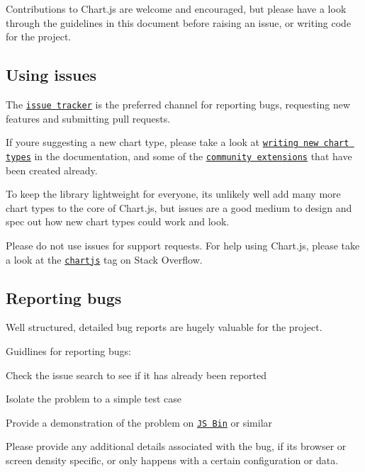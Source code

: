Contributions to Chart.\+js are welcome and encouraged, but please have a look through the guidelines in this document before raising an issue, or writing code for the project.

\subsection*{Using issues }

The \href{https://github.com/nnnick/Chart.js/issues}{\tt issue tracker} is the preferred channel for reporting bugs, requesting new features and submitting pull requests.

If you\textquotesingle{}re suggesting a new chart type, please take a look at \href{https://github.com/nnnick/Chart.js/blob/master/docs/06-Advanced.md#writing-new-chart-types}{\tt writing new chart types} in the documentation, and some of the \href{https://github.com/nnnick/Chart.js/blob/master/docs/06-Advanced.md#community-extensions}{\tt community extensions} that have been created already.

To keep the library lightweight for everyone, it\textquotesingle{}s unlikely we\textquotesingle{}ll add many more chart types to the core of Chart.\+js, but issues are a good medium to design and spec out how new chart types could work and look.

Please do not use issues for support requests. For help using Chart.\+js, please take a look at the \href{http://stackoverflow.com/questions/tagged/chartjs}{\tt {\ttfamily chartjs}} tag on Stack Overflow.

\subsection*{Reporting bugs }

Well structured, detailed bug reports are hugely valuable for the project.

Guidlines for reporting bugs\+:


\begin{DoxyItemize}
\item Check the issue search to see if it has already been reported
\item Isolate the problem to a simple test case
\item Provide a demonstration of the problem on \href{http://jsbin.com}{\tt JS Bin} or similar
\end{DoxyItemize}

Please provide any additional details associated with the bug, if it\textquotesingle{}s browser or screen density specific, or only happens with a certain configuration or data.

